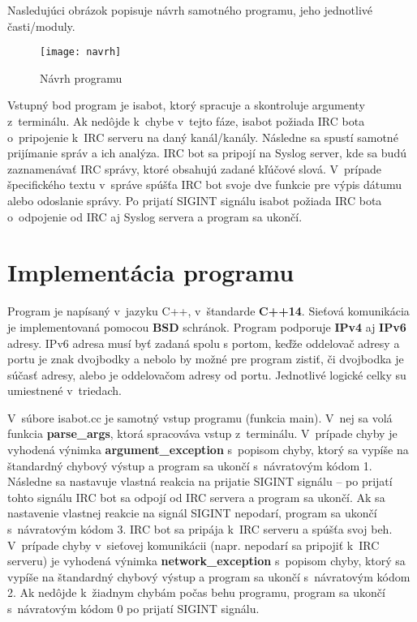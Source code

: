 Nasledujúci obrázok popisuje návrh samotného programu, jeho jednotlivé časti/moduly.

\begin{figure}[h]
	\texttt{[image: navrh]}
	\caption{Návrh programu}
\end{figure}

Vstupný bod program je isabot, ktorý spracuje a skontroluje argumenty z~terminálu. Ak nedôjde k~chybe v~tejto fáze, isabot požiada IRC bota o~pripojenie k~IRC serveru na daný kanál/kanály. Následne sa spustí samotné prijímanie správ a ich analýza. IRC bot sa pripojí na Syslog server, kde sa budú zaznamenávať IRC správy, ktoré obsahujú zadané kľúčové slová. V~prípade špecifického textu v~správe spúšťa IRC bot svoje dve funkcie pre výpis dátumu alebo odoslanie správy. Po prijatí SIGINT signálu isabot požiada IRC bota o~odpojenie od IRC aj Syslog servera a program sa ukončí.

\chapter{Implementácia programu}

Program je napísaný v~jazyku C++, v~štandarde \textbf{C++14}. Sieťová komunikácia je implementovaná pomocou \textbf{BSD} schránok. Program podporuje \textbf{IPv4} aj \textbf{IPv6} adresy. IPv6 adresa musí byť zadaná spolu s portom, keďže oddelovač adresy a portu je znak dvojbodky a nebolo by možné pre program zistiť, či dvojbodka je súčasť adresy, alebo je oddelovačom adresy od portu. Jednotlivé logické celky su umiestnené v~triedach. 

V~súbore isabot.cc je samotný vstup programu (funkcia main). V~nej sa volá funkcia \textbf{parse\_args}, ktorá spracováva vstup z~terminálu. V~prípade chyby je vyhodená výnimka \textbf{argument\_exception} s~popisom chyby, ktorý sa vypíše na štandardný chybový výstup a program sa ukončí s~návratovým kódom 1. Následne sa nastavuje vlastná reakcia na prijatie SIGINT signálu -- po prijatí tohto signálu IRC bot sa odpojí od IRC servera a program sa ukončí. Ak sa nastavenie vlastnej reakcie na signál SIGINT nepodarí, program sa ukončí s~návratovým kódom 3. IRC bot sa pripája k~IRC serveru a spúšťa svoj beh. V~prípade chyby v~sieťovej komunikácii (napr. nepodarí sa pripojiť k~IRC serveru) je vyhodená výnimka \textbf{network\_exception} s~popisom chyby, ktorý sa vypíše na štandardný chybový výstup a program sa ukončí s~návratovým kódom 2. Ak nedôjde k~žiadnym chybám počas behu programu, program sa ukončí s~návratovým kódom 0 po prijatí SIGINT signálu.

